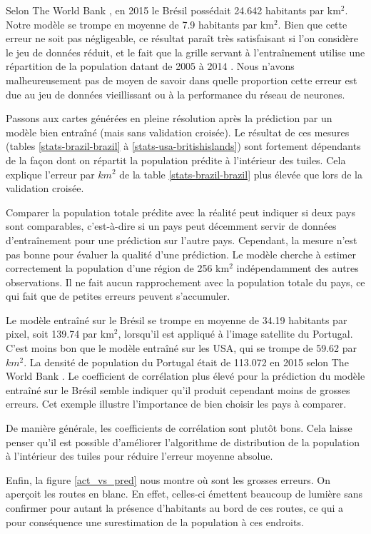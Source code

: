 \documentclass[a4paper, 11pt]{report}
\begin{document}
Selon The World Bank \cite{theworldbank}, en 2015 le Brésil possédait 24.642 habitants par km$^2$. Notre modèle se trompe en moyenne de 7.9 habitants par km$^2$. Bien que cette erreur ne soit pas négligeable, ce résultat paraît très satisfaisant si l'on considère le jeu de données réduit, et le fait que la grille servant à l'entraînement utilise une répartition de la population datant de 2005 à 2014 \cite{sedac}. Nous n'avons malheureusement pas de moyen de savoir dans quelle proportion cette erreur est due au jeu de données vieillissant ou à la performance du réseau de neurones.

Passons aux cartes générées en pleine résolution après la prédiction par un modèle bien entraîné (mais sans validation croisée). Le résultat de ces mesures (tables \ref{stats-brazil-brazil} à \ref{stats-usa-britishislands}) sont fortement dépendants de la façon dont on répartit la population prédite à l'intérieur des tuiles. Cela explique l'erreur par $km^2$ de la table \ref{stats-brazil-brazil} plus élevée que lors de la validation croisée.

Comparer la population totale prédite avec la réalité peut indiquer si deux pays sont comparables, c'est-à-dire si un pays peut décemment servir de données d'entraînement pour une prédiction sur l'autre pays. Cependant, la mesure n'est pas bonne pour évaluer la qualité d'une prédiction. Le modèle cherche à estimer correctement la population d'une région de 256 km$^2$ indépendamment des autres observations. Il ne fait aucun rapprochement avec la population totale du pays, ce qui fait que de petites erreurs peuvent s'accumuler.

Le modèle entraîné sur le Brésil se trompe en moyenne de 34.19 habitants par pixel, soit 139.74 par km$^2$, lorsqu'il est appliqué à l'image satellite du Portugal. C'est moins bon que le modèle entraîné sur les USA, qui se trompe de 59.62 par $km^2$. La densité de population du Portugal était de 113.072 en 2015 selon The World Bank \cite{theworldbank}. Le coefficient de corrélation plus élevé pour la prédiction du modèle entraîné sur le Brésil semble indiquer qu'il produit cependant moins de grosses erreurs. Cet exemple illustre l'importance de bien choisir les pays à comparer.

De manière générale, les coefficients de corrélation sont plutôt bons. Cela laisse penser qu'il est possible d'améliorer l'algorithme de distribution de la population à l'intérieur des tuiles pour réduire l'erreur moyenne absolue.

Enfin, la figure \ref{act_vs_pred} nous montre où sont les grosses erreurs. On aperçoit les routes en blanc. En effet, celles-ci émettent beaucoup de lumière sans confirmer pour autant la présence d'habitants au bord de ces routes, ce qui a pour conséquence une surestimation de la population à ces endroits.
\end{document}
